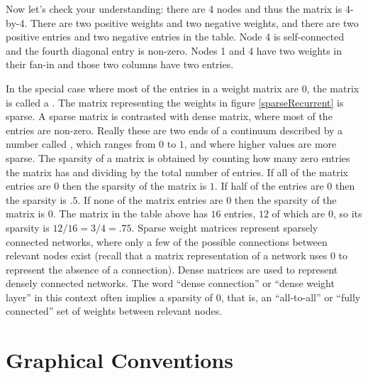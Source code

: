 \noindent Now let's check your understanding: there are 4 nodes and thus the matrix is 4-by-4. There are two positive weights and two negative weights, and there are two positive entries and two negative entries in the table. Node 4 is self-connected and the fourth diagonal entry is non-zero. Nodes 1 and 4 have two weights in their fan-in and those two columns have two entries.

In the special case where most of the entries in a weight matrix are $0$, the matrix is called a . The matrix representing the weights in figure \ref{sparseRecurrent} is sparse. A sparse matrix is contrasted with dense matrix, where most of the entries are non-zero. Really these are two ends of a continuum described by a number called , which ranges from $0$ to $1$, and where higher values are more sparse. The sparsity of a matrix is obtained by counting how many zero entries the matrix has and dividing by the total number of entries. If all of the matrix entries are $0$ then the sparsity of the matrix is $1$. If half of the entries are $0$ then the sparsity is $.5$.  If none of the matrix entries are $0$ then the sparsity of the matrix is $0$. The matrix in the table above has $16$ entries, $12$ of which are $0$, so its sparsity is $12/16 = 3/4 = .75$. Sparse weight matrices represent sparsely connected networks, where only a few of the possible connections between relevant nodes exist (recall that a matrix representation of a network uses $0$ to represent the absence of a connection).  Dense matrices are used to represent densely connected networks. The word ``dense connection'' or ``dense weight layer'' in this context often implies a sparsity of $0$, that is, an ``all-to-all'' or ``fully connected'' set of weights between relevant nodes.


\section{Graphical Conventions}\label{sourceTarget} 



